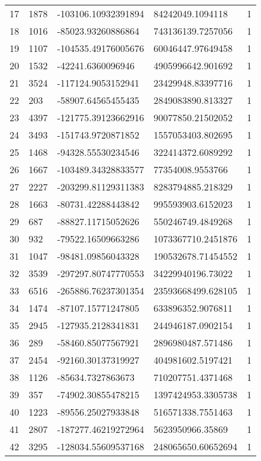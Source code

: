 \begin{longtable}{lllll}
    17 & 1878 & -103106.10932391894 & 84242049.1094118 & 1 \\
    18 & 1016 & -85023.93260886864 & 743136139.7257056 & 1 \\
    19 & 1107 & -104535.49176005676 & 60046447.97649458 & 1 \\
    20 & 1532 & -42241.6360096946 & 4905996642.901692 & 1 \\
    21 & 3524 & -117124.9053152941 & 23429948.83397716 & 1 \\
    22 & 203 & -58907.64565455435 & 2849083890.813327 & 1 \\
    23 & 4397 & -121775.39123662916 & 90077850.21502052 & 1 \\
    24 & 3493 & -151743.9720871852 & 1557053403.802695 & 1 \\
    25 & 1468 & -94328.55530234546 & 322414372.6089292 & 1 \\
    26 & 1667 & -103489.34328833577 & 77354008.9553766 & 1 \\
    27 & 2227 & -203299.81129311383 & 8283794885.218329 & 1 \\
    28 & 1663 & -80731.42288443842 & 995593903.6152023 & 1 \\
    29 & 687 & -88827.11715052626 & 550246749.4849268 & 1 \\
    30 & 932 & -79522.16509663286 & 1073367710.2451876 & 1 \\
    31 & 1047 & -98481.09856043328 & 190532678.71454552 & 1 \\
    32 & 3539 & -297297.80747770553 & 34229940196.73022 & 1 \\
    33 & 6516 & -265886.76237301354 & 23593668499.628105 & 1 \\
    34 & 1474 & -87107.15771247805 & 633896352.9076811 & 1 \\
    35 & 2945 & -127935.2128341831 & 244946187.0902154 & 1 \\
    36 & 289 & -58460.85077567921 & 2896980487.571486 & 1 \\
    37 & 2454 & -92160.30137319927 & 404981602.5197421 & 1 \\
    38 & 1126 & -85634.7327863673 & 710207751.4371468 & 1 \\
    39 & 357 & -74902.30855478215 & 1397424953.3305738 & 1 \\
    40 & 1223 & -89556.25027933848 & 516571338.7551463 & 1 \\
    41 & 2807 & -187277.46219272964 & 5623950966.35869 & 1 \\
    42 & 3295 & -128034.55609537168 & 248065650.60652694 & 1 \\

\end{longtable}
